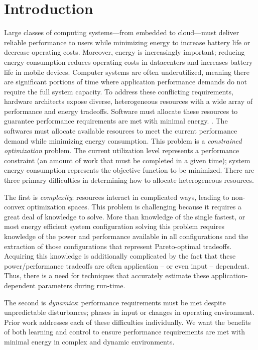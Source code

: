 \section{Introduction}

Large classes of computing systems---from embedded to cloud---must
deliver reliable performance to users while minimizing energy to
increase battery life or decrease operating costs.
Moreover, energy is increasingly important; reducing energy consumption reduces
operating costs in datacenters and increases battery life in mobile
devices.  Computer systems are often underutilized, meaning
there are significant portions of time where application performance
demands do not require the full system capacity. To address these
conflicting requirements, hardware architects expose diverse,
heterogeneous resources with a wide array of performance and energy
tradeoffs.  Software must allocate these resources to
guarantee performance requirements are met with minimal energy.
\cite{google2007,MeisnerISCA2011}. The softwares must allocate available resources
to meet the current performance demand while minimizing energy
consumption. This problem is a \emph{constrained optimization}
problem. The current utilization level represents a performance
constraint (\ie an amount of work that must be completed in a given
time); system energy consumption represents the objective function to
be minimized. There are three primary difficulties in determining how to allocate
heterogeneous resources.

The first is \emph{complexity}: resources
interact in complicated ways, leading to non-convex optimization
spaces. This problem is challenging because it requires a great deal of
knowledge to solve.  More than knowledge of the single fastest, or
most energy efficient system configuration solving this problem
requires knowledge of the power and performance available in all
configurations and the extraction of those configurations that
represent Pareto-optimal tradeoffs.  Acquiring this knowledge is
additionally complicated by the fact that these power/performance
tradeoffs are often application -- or even input -- dependent.  Thus,
there is a need for techniques that accurately estimate these
application-dependent parameters during run-time.

The second is \emph{dynamics}: perfor\-mance requirements
must be met despite unpredictable disturbances; \eg{} phases in input
or changes in operating environment.  Prior work addresses each of
these difficulties individually. We want the benefits of both learning and control
to ensure
performance requirements are met with minimal energy in complex and
dynamic environments.

